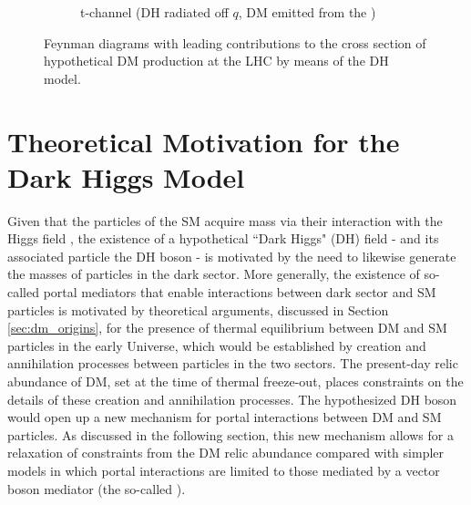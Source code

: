 \begin{figure}[hp]
\begin{subfigure}[t]{.42\textwidth}
%
%
%
%
	\caption{t-channel (DH radiated off \(q\), DM emitted from the \Zprime)}
	\label{fig:dh_tchannel}
	\end{subfigure}
	\caption{Feynman diagrams with leading contributions to the cross section of hypothetical DM production at the LHC by means of the DH model.}
	\label{fig:Feynman_DH}
\end{figure}


\section{Theoretical Motivation for the Dark Higgs Model}

Given that the particles of the SM acquire mass via their interaction with the Higgs field \cite{HiggsTheory1,HiggsTheory2,HiggsTheory3}, the existence of a hypothetical ``Dark Higgs" (DH) field - and its associated particle the DH boson - is motivated by the need to likewise generate the masses of particles in the dark sector. More generally, the existence of so-called portal mediators that enable interactions between dark sector and SM particles is motivated by theoretical arguments, discussed in Section \ref{sec:dm_origins}, for the presence of thermal equilibrium between DM and SM particles in the early Universe, which would be established by creation and annihilation processes between particles in the two sectors. The present-day relic abundance of DM, set at the time of thermal freeze-out, places constraints on the details of these creation and annihilation processes. The hypothesized DH boson would open up a new mechanism for portal interactions between DM and SM particles. As discussed in the following section, this new mechanism allows for a relaxation of constraints from the DM relic abundance compared with simpler models in which portal interactions are limited to those mediated by a vector boson mediator (the so-called \Zprime). 

